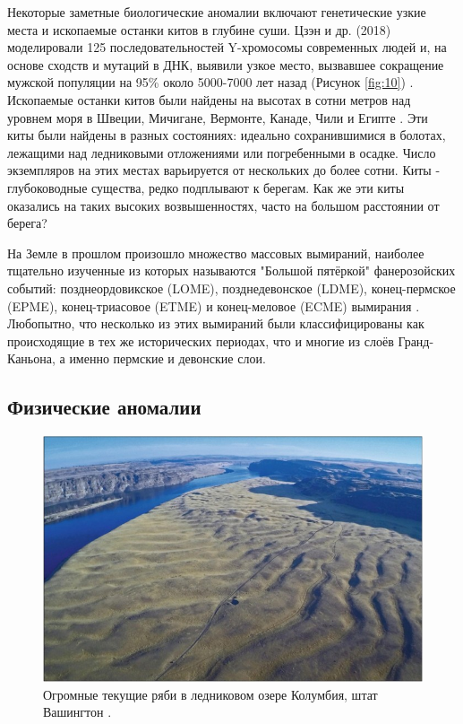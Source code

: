 \documentclass[10pt,twocolumn,letterpaper]{article}
\begin{document}
Некоторые заметные биологические аномалии включают генетические узкие места и ископаемые останки китов в глубине суши. Цзэн и др. (2018) моделировали 125 последовательностей Y-хромосомы современных людей и, на основе сходств и мутаций в ДНК, выявили узкое место, вызвавшее сокращение мужской популяции на 95\% около 5000-7000 лет назад (Рисунок \ref{fig:10}) \cite{62}. Ископаемые останки китов были найдены на высотах в сотни метров над уровнем моря в Швеции, Мичигане, Вермонте, Канаде, Чили и Египте \cite{63,64,65,66}. Эти киты были найдены в разных состояниях: идеально сохранившимися в болотах, лежащими над ледниковыми отложениями или погребенными в осадке. Число экземпляров на этих местах варьируется от нескольких до более сотни. Киты - глубоководные существа, редко подплывают к берегам. Как же эти киты оказались на таких высоких возвышенностях, часто на большом расстоянии от берега?

На Земле в прошлом произошло множество массовых вымираний, наиболее тщательно изученные из которых называются "Большой пятёркой" фанерозойских событий: позднеордовикское (LOME), позднедевонское (LDME), конец-пермское (EPME), конец-триасовое (ETME) и конец-меловое (ECME) вымирания \cite{88,89}. Любопытно, что несколько из этих вымираний были классифицированы как происходящие в тех же исторических периодах, что и многие из слоёв Гранд-Каньона, а именно пермские и девонские слои.

\subsection{Физические аномалии}

\begin{figure}[b]
\begin{center}
   \includegraphics[width=1\linewidth]{columbia.jpg}
\end{center}
   \caption{Огромные текущие ряби в ледниковом озере Колумбия, штат Вашингтон \cite{80}.}
\label{fig:11}
\label{fig:onecol}
\end{figure}
\end{document}
